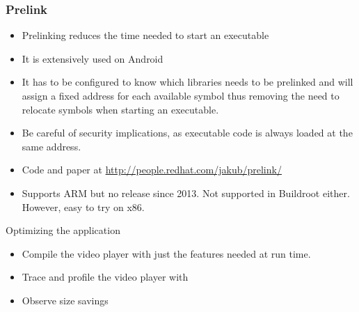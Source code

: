 \begin{frame}
\frametitle{Prelink}
\begin{itemize}
\item Prelinking reduces the time needed to start an executable
\item It is extensively used on Android
\item It has to be configured to know which libraries needs to be
      prelinked and will assign a fixed address for each available
      symbol thus removing the need to relocate symbols when starting
      an executable.
\item Be careful of security implications, as executable code is
      always loaded at the same address.
\item Code and paper at
      \url{http://people.redhat.com/jakub/prelink/}
\item Supports ARM but no release since 2013. Not supported in Buildroot
      either. However, easy to try on x86.
\end{itemize}
\end{frame}

\setuplabframe
{Optimizing the application}
{
\begin{itemize}
\item Compile the video player with just the features needed at run
      time.
\item Trace and profile the video player with 
\item Observe size savings
\end{itemize}
}

